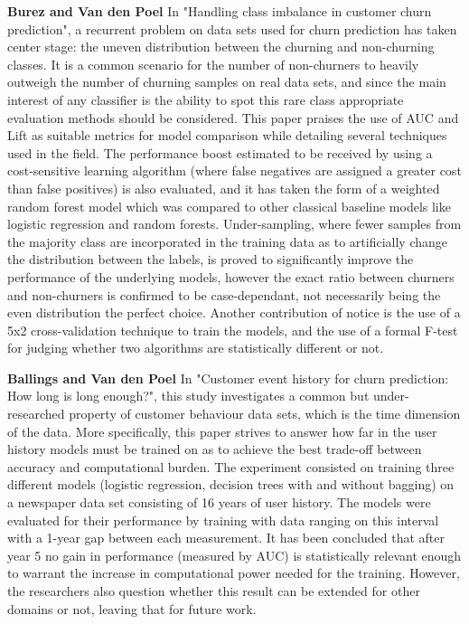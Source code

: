 \documentclass{kththesis}
\begin{document}
\textbf{Burez and Van den Poel} \citep{Burez2009} In "Handling class imbalance in customer churn prediction", a recurrent problem on data sets used for churn prediction has taken center stage: the uneven distribution between the churning and non-churning classes. It is a common scenario for the number of non-churners to heavily outweigh the number of churning samples on real data sets, and since the main interest of any classifier is the ability to spot this rare class appropriate evaluation methods should be considered. This paper praises the use of AUC and Lift as suitable metrics for model comparison while detailing several techniques used in the field. The performance boost estimated to be received by using a cost-sensitive learning algorithm (where false negatives are assigned a greater cost than false positives) is also evaluated, and it has taken the form of a weighted random forest model which was compared to other classical baseline models like logistic regression and random forests. Under-sampling, where fewer samples from the majority class are incorporated in the training data as to artificially change the distribution between the labels, is proved to significantly improve the performance of the underlying models, however the exact ratio between churners and non-churners is confirmed to be case-dependant, not necessarily being the even distribution the perfect choice. Another contribution of notice is the use of a 5x2 cross-validation technique to train the models, and the use of a formal F-test for judging whether two algorithms are statistically different or not.

\textbf{Ballings and Van den Poel} \citep{Ballings2012} In "Customer event history for churn prediction: How long is long enough?", this study investigates a common but under-researched property of customer behaviour data sets, which is the time dimension of the data. More specifically, this paper strives to answer how far in the user history models must be trained on as to achieve the best trade-off between accuracy and computational burden. The experiment consisted on training three different models (logistic regression, decision trees with and without bagging) on a newspaper data set consisting of 16 years of user history. The models were evaluated for their performance by training with data ranging on this interval with a 1-year gap between each measurement. It has been concluded that  after year 5 no gain in performance (measured by AUC) is statistically relevant enough to warrant the increase in computational power needed for the training. However, the researchers also question whether this result can be extended for other domains or not, leaving that for future work.
\end{document}
